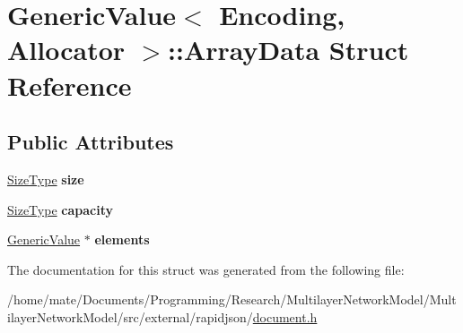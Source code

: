 \hypertarget{structGenericValue_1_1ArrayData}{}\section{Generic\+Value$<$ Encoding, Allocator $>$\+:\+:Array\+Data Struct Reference}
\label{structGenericValue_1_1ArrayData}
\subsection*{Public Attributes}
\begin{DoxyCompactItemize}
\item 
\hyperlink{rapidjson_8h_a5ed6e6e67250fadbd041127e6386dcb5}{Size\+Type} {\bfseries size}\hypertarget{structGenericValue_1_1ArrayData_a5306856f64aea8ec53abf263ed2a35e2}{}\label{structGenericValue_1_1ArrayData_a5306856f64aea8ec53abf263ed2a35e2}

\item 
\hyperlink{rapidjson_8h_a5ed6e6e67250fadbd041127e6386dcb5}{Size\+Type} {\bfseries capacity}\hypertarget{structGenericValue_1_1ArrayData_a0c6fe03c00e13d14b95abd31048aa1f5}{}\label{structGenericValue_1_1ArrayData_a0c6fe03c00e13d14b95abd31048aa1f5}

\item 
\hyperlink{classGenericValue}{Generic\+Value} $\ast$ {\bfseries elements}\hypertarget{structGenericValue_1_1ArrayData_a86df976cb6f65924aca20eb9bd35553e}{}\label{structGenericValue_1_1ArrayData_a86df976cb6f65924aca20eb9bd35553e}

\end{DoxyCompactItemize}


The documentation for this struct was generated from the following file\+:\begin{DoxyCompactItemize}
\item 
/home/mate/\+Documents/\+Programming/\+Research/\+Multilayer\+Network\+Model/\+Multilayer\+Network\+Model/src/external/rapidjson/\hyperlink{document_8h}{document.\+h}\end{DoxyCompactItemize}

